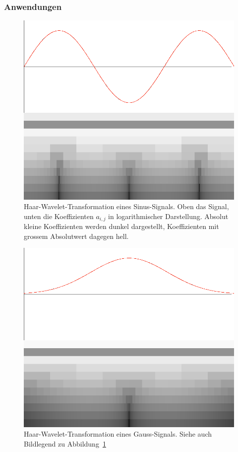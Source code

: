 \subsubsection{Anwendungen}
\begin{figure}
\begin{center}
\includegraphics[width=\hsize]{graphics/wavelet-sin3}
\end{center}
\caption{Haar-Wavelet-Transformation eines Sinus-Signals. Oben das Signal,
unten die Koeffizienten $a_{i,j}$ in logarithmischer Darstellung.
Absolut kleine Koeffizienten werden dunkel dargestellt, Koeffizienten
mit grossem Absolutwert dagegen hell.\label{wavelet-sin}}
\end{figure}
\begin{figure}
\begin{center}
\includegraphics[width=\hsize]{graphics/wavelet-normal}
\end{center}
\caption{Haar-Wavelet-Transformation eines Gauss-Signals. Siehe 
auch Bildlegend zu Abbildung~\ref{wavelet-sin}\label{wavelet-normal}}
\end{figure}
